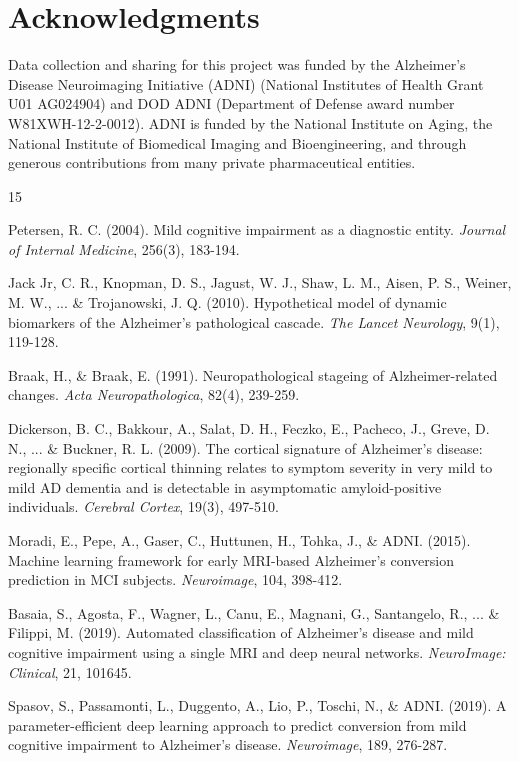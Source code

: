 \documentclass[11pt, a4paper]{article}
\begin{document}
\section*{Acknowledgments}
Data collection and sharing for this project was funded by the Alzheimer's Disease Neuroimaging Initiative (ADNI) (National Institutes of Health Grant U01 AG024904) and DOD ADNI (Department of Defense award number W81XWH-12-2-0012). ADNI is funded by the National Institute on Aging, the National Institute of Biomedical Imaging and Bioengineering, and through generous contributions from many private pharmaceutical entities.

\begin{thebibliography}{15}

Petersen, R. C. (2004). Mild cognitive impairment as a diagnostic entity. \textit{Journal of Internal Medicine}, 256(3), 183-194.

Jack Jr, C. R., Knopman, D. S., Jagust, W. J., Shaw, L. M., Aisen, P. S., Weiner, M. W., ... \& Trojanowski, J. Q. (2010). Hypothetical model of dynamic biomarkers of the Alzheimer's pathological cascade. \textit{The Lancet Neurology}, 9(1), 119-128.

Braak, H., \& Braak, E. (1991). Neuropathological stageing of Alzheimer-related changes. \textit{Acta Neuropathologica}, 82(4), 239-259.

Dickerson, B. C., Bakkour, A., Salat, D. H., Feczko, E., Pacheco, J., Greve, D. N., ... \& Buckner, R. L. (2009). The cortical signature of Alzheimer's disease: regionally specific cortical thinning relates to symptom severity in very mild to mild AD dementia and is detectable in asymptomatic amyloid-positive individuals. \textit{Cerebral Cortex}, 19(3), 497-510.

Moradi, E., Pepe, A., Gaser, C., Huttunen, H., Tohka, J., \& ADNI. (2015). Machine learning framework for early MRI-based Alzheimer's conversion prediction in MCI subjects. \textit{Neuroimage}, 104, 398-412.

Basaia, S., Agosta, F., Wagner, L., Canu, E., Magnani, G., Santangelo, R., ... \& Filippi, M. (2019). Automated classification of Alzheimer's disease and mild cognitive impairment using a single MRI and deep neural networks. \textit{NeuroImage: Clinical}, 21, 101645.

Spasov, S., Passamonti, L., Duggento, A., Lio, P., Toschi, N., \& ADNI. (2019). A parameter-efficient deep learning approach to predict conversion from mild cognitive impairment to Alzheimer's disease. \textit{Neuroimage}, 189, 276-287.


\end{thebibliography}
\end{document}
